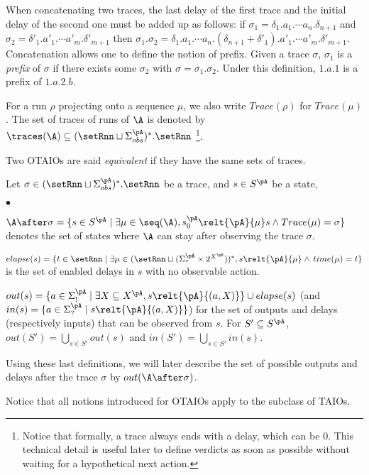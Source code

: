 \documentclass{LMCS}
\theoremstyle{plain}\newtheorem{proposition}[thm]{Proposition}
\begin{document}
When concatenating two traces, the last delay of the first trace and
the initial delay of the second one must be added up as follows: if
$\sigma_1=\delta_1.a_1.\cdots a_n.\delta_{n+1}$ and
$\sigma_2=\delta'_1.a'_1.\cdots a'_m.\delta'_{m+1}$ then
$\sigma_1.\sigma_2= \delta_1.a_1.\cdots
a_n.(\delta_{n+1}+\delta'_1).a'_1.\cdots a'_m.\delta'_{m+1}$.  Concatenation allows one to define the notion of prefix. Given a
  trace $\sigma$, $\sigma_1$ is a \emph{prefix} of $\sigma$ if there
  exists some $\sigma_2$ with $\sigma = \sigma_1.  \sigma_2$. Under
  this definition, $1.a.1$ is a prefix of $1.a.2.b$.

For a run $\rho$ projecting onto a sequence $\mu$, 
we also write $Trace(\rho)$ for $Trace(\mu)$.  
The set of traces of runs of $\A$ is denoted by
$\traces(\A)\subseteq (\setRnn \sqcup \Sigma_{obs}^\pA)^*.\setRnn$
\footnote{Notice that formally, a trace always ends with a delay, which can be $0$.
This technical detail is useful later to define verdicts as soon as possible 
without waiting for a hypothetical next action.
}. 



 Two OTAIOs are said
\emph{equivalent} if they have the same sets of traces.

Let $\sigma \in (\setRnn \sqcup \Sigma_{obs}^\pA)^*.\setRnn$ be a trace, 
and $s \in S^\pA$ be a state, 
\begin{iteMize}{$\bullet$}
\item 
$\A \after \sigma =\{s \in S^\pA \mid \exists \mu \in \seq(\A),
s_0^\pA \relt{\pA}{\mu} s \wedge Trace(\mu)=\sigma\}$ denotes the set of
states where $\A$ can stay after observing the trace $\sigma$.
\item
$elapse(s)= \{t \in \setRnn\mid 
\exists \mu \in (\setRnn \sqcup (\Sigma_\tau^\pA\times 2^{X^\pA}))^*, 
s \relt{\pA}{\mu} \wedge \, time(\mu)=t\}$ is the set of
enabled delays in $s$ with no  observable action.
\item  $out(s) = \{a \in \Sigma_!^\pA \mid \exists X
\subseteq X^\pA, s \relt{\pA}{(a,X)}\} \cup elapse(s)$ (and $in(s) =
\{a \in \Sigma_?^\pA \mid s \relt{\pA}{(a,X)}\}$) for the set of
outputs and delays (respectively inputs) that can be observed from
$s$.  
For $S'\subseteq S^\pA$, $out(S')=\bigcup_{s \in S'}out(s)$
and $in(S')=\bigcup_{s \in S'}in(s)$.
\end{iteMize}
Using these last definitions, 
we will later describe 
the set of 
possible outputs and delays after the trace $\sigma$
by  $out(\A \after \sigma)$.

Notice that all notions introduced for OTAIOs apply to the subclass of TAIOs. 
\end{document}
